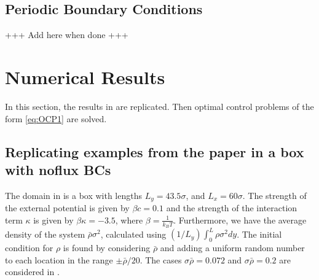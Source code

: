 \documentclass[11pt, a4paper]{article}
\theoremstyle{definition}
\begin{document}
\subsection{Periodic Boundary Conditions}
+++ Add here when done +++
\section{Numerical Results}
In this section, the results in \cite{ArcherSed1} are replicated. Then optimal control problems of the form \eqref{eq:OCP1} are solved.

\subsection{Replicating examples from the paper in a box with noflux BCs}
The domain in \cite{ArcherSed1} is a box with lengths $L_y = 43.5 \sigma$, and $L_x = 60 \sigma$. 
The strength of the external potential is given by $\beta c = 0.1$ and the strength of the interaction term $\kappa$ is given by $\beta \kappa = - 3.5$, where $\beta = \frac{1}{k_BT}$. 
Furthermore, we have the average density of the system $\bar \rho \sigma^2$, calculated using $(1/L_y)\int_0^L \rho \sigma^2 dy$.
The initial condition for $\rho$ is found by considering $\bar \rho$ and adding a uniform random number to each location in the range $\pm \bar \rho/ 20$. The cases $\sigma \bar \rho = 0.072$ and $\sigma \bar \rho = 0.2$ are considered in \cite{ArcherSed1}.
%
\end{document}
